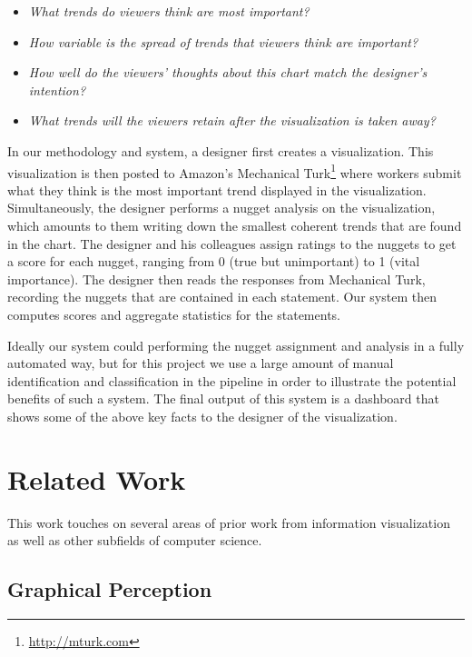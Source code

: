 \documentclass{sigchi}
\begin{document}
\begin{itemize}
  \item \textit{What trends do viewers think are most important?}
  \item \textit{How variable is the spread of trends that viewers
  think are important?}
  \item \textit{How well do the viewers' thoughts about this chart
  match the designer's intention?}
  \item \textit{What trends will the viewers retain after the
  visualization is taken away?}
\end{itemize}

In our methodology and system, a designer first creates a
visualization. This visualization is then posted to Amazon's
Mechanical Turk\footnote{\url{http://mturk.com}} where workers submit
what they think is the most important trend displayed in the
visualization. Simultaneously, the designer performs a nugget analysis
on the visualization, which amounts to them writing down the smallest
coherent trends that are found in the chart. The designer and his
colleagues assign ratings to the nuggets to get a score for each
nugget, ranging from 0 (true but unimportant) to 1 (vital importance).
The designer then reads the responses from Mechanical Turk, recording
the nuggets that are contained in each statement. Our system then
computes scores and aggregate statistics for the statements.

Ideally our system could performing the nugget assignment and analysis
in a fully automated way, but for this project we use a large amount
of manual identification and classification in the pipeline in order
to illustrate the potential benefits of such a system. The final
output of this system is a dashboard that shows some of the above key
facts to the designer of the visualization.

\section{Related Work}

This work touches on several areas of prior work from information
visualization as well as other subfields of computer science.

\subsection{Graphical Perception}
\end{document}
